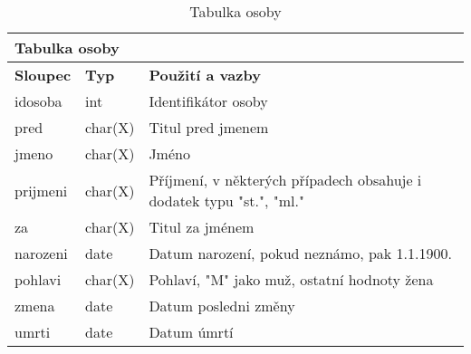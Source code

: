 \begin{center}
	\begin{longtable}{|l|l|p{9cm}|}
		\caption{Tabulka osoby
		} \label{table:osoby} \\
		
		\hline 
		
		\multicolumn{3}{|l|}{\textbf{Tabulka osoby
		}} \\
		
		\hline 
		
		\multicolumn{1}{|l|}{\textbf{Sloupec}} & \multicolumn{1}{l|}{\textbf{Typ}} & \multicolumn{1}{l|}{\textbf{Použití a vazby}} \\ 
		
		\endhead
		
		\hline 
		
		id\textunderscore osoba & int & Identifikátor osoby \\
		
		\hline 
		
		pred & char(X) & Titul pred jmenem \\
		
		\hline 
		
		jmeno & char(X) & Jméno \\
		
		\hline 
		
		prijmeni & char(X) & Příjmení, v některých případech obsahuje i dodatek typu "st.", "ml." \\
		
		\hline 
		
		za & char(X) & Titul za jménem \\
		
		\hline 
		
		narozeni & date & Datum narození, pokud neznámo, pak 1.1.1900. \\
		
		\hline 
		
		pohlavi & char(X) & Pohlaví, "M" jako muž, ostatní hodnoty žena \\
		
		\hline 
		
		zmena & date & Datum posledni změny \\
		
		\hline 
		
		umrti & date & Datum úmrtí \\
		
		\hline 
		
		
	\end{longtable}
\end{center}

